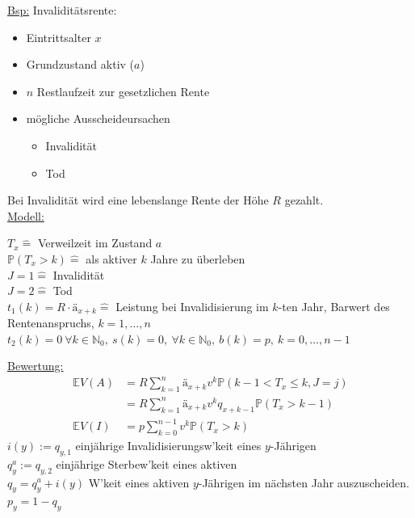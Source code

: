 \uline{Bsp:} Invaliditätsrente:\\
\begin{itemize}
	\item Eintrittsalter $x$
	\item Grundzustand aktiv ($a$)
	\item $n$ Restlaufzeit zur gesetzlichen Rente
	\item mögliche Ausscheideursachen
	\begin{itemize}
		\item Invalidität
		\item Tod
	\end{itemize}
\end{itemize}
Bei Invalidität wird eine lebenslange Rente der Höhe $R$ gezahlt.\\
\uline{Modell:}\\
\begin{center}
	$T_x \mathrel{\hat{=}}$ Verweilzeit im Zustand $a$\\
	$\mathds{P}(T_x>k) \mathrel{\hat{=}}$ als aktiver $k$ Jahre zu überleben\\
	$J=1 \mathrel{\hat{=}}$ Invalidität\\
	$J=2 \mathrel{\hat{=}}$ Tod\\
	$t_1(k)=R\cdot ä_{x+k} \mathrel{\hat{=}}$ Leistung bei Invalidisierung im $k$-ten Jahr, Barwert des Rentenanspruchs, $k=1,\dots,n$\\
	$t_2(k)=0~\forall k\in \mathds{N}_0,~s(k)=0,~\forall k\in \mathds{N}_0,~b(k)=p,~ k=0,\dots,n-1$
\end{center}
\uline{Bewertung:}\\
\begin{equation*}
\begin{aligned}
	\mathds{E}V(A) &= R\sum_{k=1}^{n}ä_{x+k}v^k\mathds{P}(k-1<T_x\le k,J=j)\\
	&= R\sum_{k=1}^{n}ä_{x+k}v^kq_{x+k-1}\mathds{P}(T_x>k-1)\\
	\mathds{E}V(I) &= p\sum_{k=0}^{n-1}v^k\mathds{P}(T_x>k)
\end{aligned}
\end{equation*}
$i(y):=q_{y,1}$ einjährige Invalidisierungsw'keit eines $y$-Jährigen\\
$q_y^a:=q_{y,2}$ einjährige Sterbew'keit eines aktiven\\
$q_y=q_y^a+i(y)$ W'keit eines aktiven $y$-Jährigen im nächsten Jahr auszuscheiden.\\
$p_y=1-q_y$\\
\newpage
